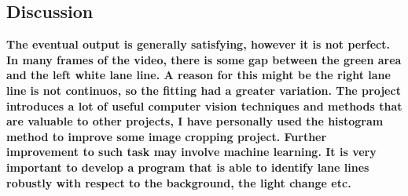 \documentclass[11pt]{article}
\begin{document}
    \hypertarget{discussion}{%
\subsection{Discussion}\label{discussion}}

\textbf{The eventual output is generally satisfying, however it is not
perfect. In many frames of the video, there is some gap between the
green area and the left white lane line. A reason for this might be the
right lane line is not continuos, so the fitting had a greater
variation. The project introduces a lot of useful computer vision
techniques and methods that are valuable to other projects, I have
personally used the histogram method to improve some image cropping
project. Further improvement to such task may involve machine learning.
It is very important to develop a program that is able to identify lane
lines robustly with respect to the background, the light change etc.}


    
    
    
    
\end{document}

